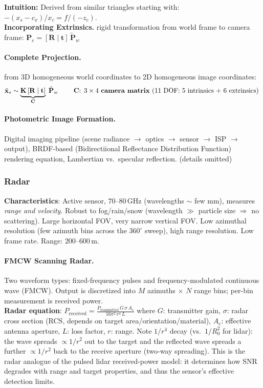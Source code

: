 \documentclass{article}
\begin{document}
\textbf{Intuition:} Derived from similar triangles starting with: $-(x_s - c_x)/x_c = f/(-z_c)$.\\
 
\textbf{Incorporating Extrinsics.} rigid transformation from world frame to camera frame: $ \mathbf{P}_c = [\mathbf{R} \mid \mathbf{t}]\, \tilde{\mathbf{P}}_w$

\paragraph{Complete Projection.} from 3D homogeneous world coordinates to 2D homogeneous image coordinates:
\begin{equation*}
    \tilde{\mathbf{x}}_s \sim \underbrace{\mathbf{K}\, [\mathbf{R} \mid \mathbf{t}]}_{\mathbf{C}}\; \tilde{\mathbf{P}}_w \qquad \text{ $\mathbf{C}$: $3 \times 4$ \textbf{camera matrix} (11 DOF: 5 intrinsics $+$ 6 extrinsics)
}
\end{equation*}

\paragraph{Photometric Image Formation.}
Digital imaging pipeline (scene radiance $\to$ optics $\to$ sensor $\to$ ISP $\to$ output), BRDF-based (Bidirectiional Reflectance Distribution Function) rendering equation, Lambertian vs.\ specular reflection. (details omitted)

\subsubsection{Radar}
\textbf{Characteristics}: Active sensor, $70$--$80$\,GHz (wavelengths $\sim$ few mm), measures \textit{range and velocity}. Robust to fog/rain/snow (wavelength $\gg$ particle size $\Rightarrow$ no scattering). Large horizontal FOV, very narrow vertical FOV. Low azimuthal resolution (few azimuth bins across the $360^\circ$ sweep), high range resolution. Low frame rate. Range: $200$--$600$\,m.

\paragraph{FMCW Scanning Radar.}
Two waveform types: fixed-frequency pulses and frequency-modulated continuous wave (FMCW). Output is discretized into $M$ azimuths $\times$ $N$ range bins; per-bin measurement is received power.\\
 
\textbf{Radar equation}: $P_{\text{received}} = \frac{P_{\text{transmitted}}\, G\, \sigma\, A_e}{16\pi^2\, r^4\, L}$
where $G$: transmitter gain, $\sigma$: radar cross section (RCS, depends on target area/orientation/material), $A_e$: effective antenna aperture, $L$: loss factor, $r$: range. Note $1/r^4$ decay (vs.\ $1/R_0^2$ for lidar): the wave spreads $\propto 1/r^2$ out to the target and the reflected wave spreads a further $\propto 1/r^2$ back to the receive aperture (two-way spreading). This is the radar analogue of the pulsed lidar received-power model: it determines how SNR degrades with range and target properties, and thus the sensor's effective detection limits.\\
\end{document}
